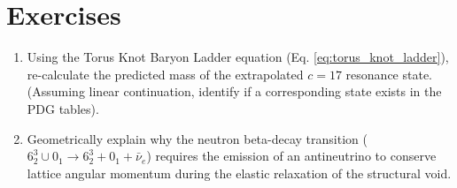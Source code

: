 \section*{Exercises}
\begin{enumerate}
    \item Using the Torus Knot Baryon Ladder equation (Eq. \ref{eq:torus_knot_ladder}), re-calculate the predicted mass of the extrapolated $c=17$ resonance state. (Assuming linear continuation, identify if a corresponding state exists in the PDG tables).
    \item Geometrically explain why the neutron beta-decay transition ($6_2^3 \cup 0_1 \to 6_2^3 + 0_1 + \bar{\nu}_e$) requires the emission of an antineutrino to conserve lattice angular momentum during the elastic relaxation of the structural void.
\end{enumerate}